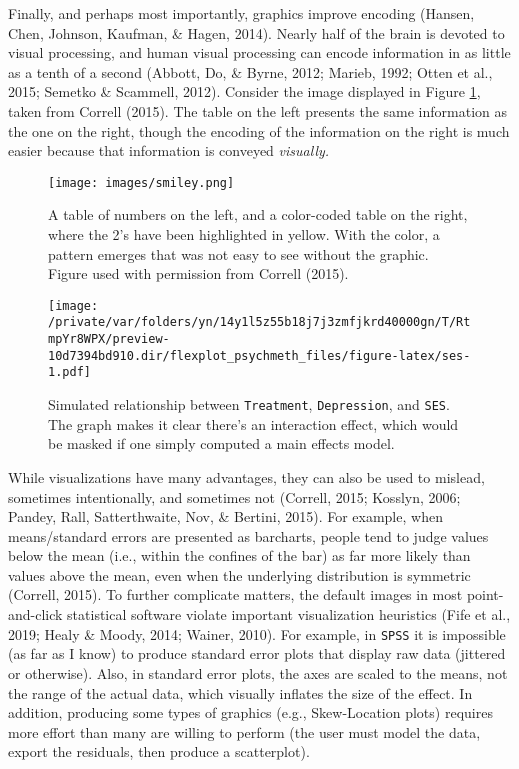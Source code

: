 \documentclass[
  english,
  man]{apa6}
\begin{document}
Finally, and perhaps most importantly, graphics improve encoding (Hansen, Chen, Johnson, Kaufman, \& Hagen, 2014). Nearly half of the brain is devoted to visual processing, and human visual processing can encode information in as little as a tenth of a second (Abbott, Do, \& Byrne, 2012; Marieb, 1992; Otten et al., 2015; Semetko \& Scammell, 2012). Consider the image displayed in Figure \ref{fig:smiley}, taken from Correll (2015). The table on the left presents the same information as the one on the right, though the encoding of the information on the right is much easier because that information is conveyed \emph{visually.}

\begin{figure}
\centering
\texttt{[image: images/smiley.png]}
\caption{A table of numbers on the left, and a color-coded table on the right, where the 2's have been highlighted in yellow. With the color, a pattern emerges that was not easy to see without the graphic. Figure used with permission from Correll (2015).}
\label{fig:smiley}
\end{figure}

\begin{figure}
\centering
\texttt{[image: /private/var/folders/yn/14y1l5z55b18j7j3zmfjkrd40000gn/T/RtmpYr8WPX/preview-10d7394bd910.dir/flexplot\_psychmeth\_files/figure-latex/ses-1.pdf]}
\caption{\label{fig:ses}Simulated relationship between \texttt{Treatment}, \texttt{Depression}, and \texttt{SES}. The graph makes it clear there's an interaction effect, which would be masked if one simply computed a main effects model.}
\end{figure}

While visualizations have many advantages, they can also be used to mislead, sometimes intentionally, and sometimes not (Correll, 2015; Kosslyn, 2006; Pandey, Rall, Satterthwaite, Nov, \& Bertini, 2015). For example, when means/standard errors are presented as barcharts, people tend to judge values below the mean (i.e., within the confines of the bar) as far more likely than values above the mean, even when the underlying distribution is symmetric (Correll, 2015). To further complicate matters, the default images in most point-and-click statistical software violate important visualization heuristics (Fife et al., 2019; Healy \& Moody, 2014; Wainer, 2010). For example, in \texttt{SPSS} it is impossible (as far as I know) to produce standard error plots that display raw data (jittered or otherwise). Also, in standard error plots, the axes are scaled to the means, not the range of the actual data, which visually inflates the size of the effect. In addition, producing some types of graphics (e.g., Skew-Location plots) requires more effort than many are willing to perform (the user must model the data, export the residuals, then produce a scatterplot).
\end{document}
